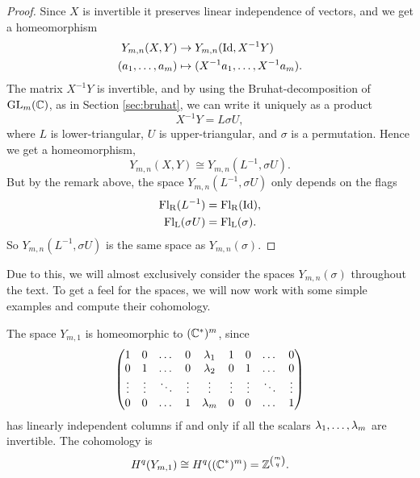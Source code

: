 \begin{proof}
  Since $X$ is invertible it preserves linear independence of vectors,
  and we get a homeomorphism
  \begin{align*}
    Y_{m,n}(X,Y) &\to Y_{m,n}(\operatorname{Id},X^{-1}Y) \\
    (a_1,\dots,a_m) &\mapsto (X^{-1}a_1,\dots,X^{-1}a_m).
  \end{align*}
  The matrix $X^{-1}Y$ is invertible, and by using the
  Bruhat-decomposition of $\operatorname{GL}_m(\mathbb{C})$, as in Section \ref{sec:bruhat},
  we can write it uniquely as a product 
  \[ X^{-1}Y = L\sigma U, \]
  where $L$ is lower-triangular, $U$ is upper-triangular, and $\sigma$
  is a permutation. Hence we get a homeomorphism,
  \[ Y_{m,n}(X,Y) \cong Y_{m,n}(L^{-1}, \sigma U). \]
  But by the remark above, the space $Y_{m,n}(L^{-1},\sigma U)$ only
  depends
  on the flags 
  \begin{align*}
    \mathrm{Fl_R}(L^{-1}) &= \mathrm{Fl_R}(\operatorname{Id}), \\
    \mathrm{Fl_L}(\sigma U) &= \mathrm{Fl_L}(\sigma).
  \end{align*}
  So $Y_{m,n}(L^{-1},\sigma U)$ is the same space as
  $Y_{m,n}(\sigma)$.
\end{proof}

Due to this, we will almost exclusively consider the spaces
$Y_{m,n}(\sigma)$ throughout the text. To get a feel for the spaces,
we will now work with some simple examples and compute their
cohomology.

\begin{example}
  \label{ex:n=1}

  The space $Y_{m,1}$ is homeomorphic to $(\mathbb{C}^*)^m$, since
  \[\begin{pmatrix}
    1&0&\dots&0&\lambda_1&1&0&\dots&0 \\
    0&1&\dots&0&\lambda_2&0&1&\dots&0 \\
    \vdots&\vdots&\ddots&\vdots&\vdots&\vdots&\vdots&\ddots&\vdots \\
    0&0&\dots&1&\lambda_m&0&0&\dots&1
  \end{pmatrix} \]
  has linearly independent columns if and only if all the scalars
  $\lambda_1,\dots,\lambda_m$ are invertible. The cohomology is
  \[ H^q(Y_{m,1}) \cong H^q((\mathbb{C}^*)^m) = \mathbb{Z}^{{m \choose q}}. \]
\end{example}

